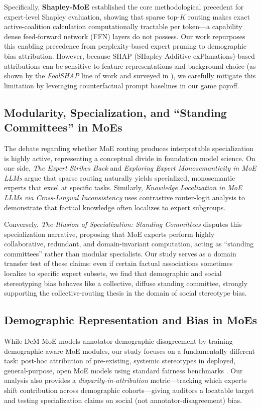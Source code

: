 \documentclass[11pt,a4paper]{article}
\begin{document}
Specifically, \textbf{Shapley-MoE} \cite{shapley_moe} established the core methodological precedent for expert-level Shapley evaluation, showing that sparse top-$K$ routing makes exact active-coalition calculation computationally tractable per token—a capability dense feed-forward network (FFN) layers do not possess. Our work repurposes this enabling precedence from perplexity-based expert pruning to demographic bias attribution. However, because SHAP (SHapley Additive exPlanations)-based attributions can be sensitive to feature representations and background choice (as shown by the \textit{FoolSHAP} \cite{foolshap} line of work and surveyed in \cite{bias_survey_2026}), we carefully mitigate this limitation by leveraging counterfactual prompt baselines in our game payoff.

\subsection{Modularity, Specialization, and ``Standing Committees'' in MoEs}
The debate regarding whether MoE routing produces interpretable specialization is highly active, representing a conceptual divide in foundation model science. On one side, \textit{The Expert Strikes Back} \cite{expert_strikes_back} and \textit{Exploring Expert Monosemanticity in MoE LLMs} \cite{exploring_expert_monosemanticity} argue that sparse routing naturally yields specialized, monosemantic experts that excel at specific tasks. Similarly, \textit{Knowledge Localization in MoE LLMs via Cross-Lingual Inconsistency} \cite{knowledge_localization_moe} uses contrastive router-logit analysis to demonstrate that factual knowledge often localizes to expert subgroups. 

Conversely, \textit{The Illusion of Specialization: Standing Committees} \cite{illusion_specialization} disputes this specialization narrative, proposing that MoE experts perform highly collaborative, redundant, and domain-invariant computation, acting as ``standing committees'' rather than modular specialists. Our study serves as a domain transfer test of these claims: even if certain factual associations sometimes localize to specific expert subsets, we find that demographic and social stereotyping bias behaves like a collective, diffuse standing committee, strongly supporting the collective-routing thesis in the domain of social stereotype bias.

\subsection{Demographic Representation and Bias in MoEs}
While DeM-MoE \cite{dem_moe} models annotator demographic disagreement by training demographic-aware MoE modules, our study focuses on a fundamentally different task: post-hoc attribution of pre-existing, systemic stereotypes in deployed, general-purpose, open MoE models using standard fairness benchmarks \cite{stereoset, bbq, winogender}. Our analysis also provides a \textit{disparity-in-attribution} metric---tracking which experts shift contribution across demographic cohorts---giving auditors a locatable target and testing specialization claims on social (not annotator-disagreement) bias.
\end{document}
